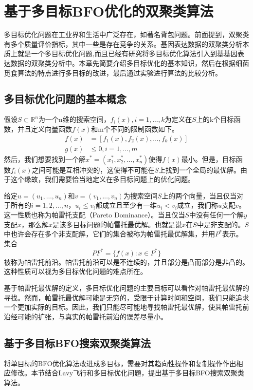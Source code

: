 \chapter{基于多目标BFO优化的双聚类算法}
多目标优化问题在工业界和生活中广泛存在，如著名背包问题。前面提到，双聚类有多个质量评价指标，其中一些是存在竞争的关系。基因表达数据的双聚类分析本质上就是一个多目标优化问题,而且已经有研究将多目标优化算法引入到基基因表达数据的双聚类分析中。本章先简要介绍多目标优化的基本知识，然后在根据细菌觅食算法的特点进行多目标的改进，最后通过实验进行算法的比较分析。

\section{多目标优化问题的基本概念}
假设$S\subset \mathbb{R}^n$为一个n维的搜索空间，$f_i(x),i=1,...,k$为定义在$S$上的k个目标函数，并且定义向量函数$f(x)$和m个不同的限制函数如下。
\begin{align}
   f(x) &= [f_1(x),f_2(x),...,f_k(x)] \\
    g(x) &\leq 0, i= 1,...,m
\end{align}
然后，我们想要找到一个解$x^{\ast} =(x_1^{\ast},x_2^{\ast},...,x_n^{\ast})$使得$f(x)$最小。但是，目标函数$f_i(x)$之间可能是互相冲突的，这使得不可能在$S$上找到一个全局的最优解。由于这个缘故，我们需要恰当地定义在多目标问题上的优化问题。

给定$u=(u_1,...,u_n)$和$v=(v_1,...,v_n)$为搜索空间$S$上的两个向量，当且仅当对于所有的$i=1,2,...,n$，$u_i \le v_i$都成立且至少有一维$u_i<v_i$成立，我们称$u$支配$v$。这一性质也称为帕雷托支配（Pareto Dominance）。当且仅当$S$中没有任何一个解$y$支配$x$，那么解$x$是该多目标问题的帕雷托最优解。也就是说$x$在$S$中是非支配的。$S$中也许会存在多个非支配解，它们的集合被称为帕雷托最优解集，并用$P^*$表示。集合
\begin{equation}
   PF^* = \{f(x): x\in P^*\} 
\end{equation}
被称为帕雷托前沿。帕雷托前沿可以是不连续的，并且部分是凸而部分是非凸的。这种性质可以视为多目标优化问题的难点所在。

基于帕雷托最优解的定义，多目标优化问题的主要目标可以看作对帕雷托最优解的寻找。然而，帕雷托最优解可能是无穷的，受限于计算时间和空间，我们只能追求一个更加实际的目标。因此，我们只能尽可能地寻找帕雷托最优解，使其帕雷托前沿经可能的扩张，与真实的帕雷托前沿的误差尽量小。

\section{基于多目标BFO搜索双聚类算法}
将单目标的BFO优化算法改进成多目标，需要对其趋向性操作和复制操作作出相应修改。本节结合Lavy飞行和多目标优化问题，提出基于多目标BFO搜索双聚类算法。

